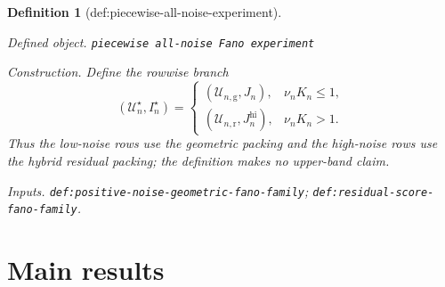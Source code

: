 \documentclass{article}
\newtheorem{definition}{Definition}
\begin{document}
\begin{definition}[def:piecewise-all-noise-experiment]\label{def:piecewise-all-noise-experiment}
\par\smallskip\noindent\emph{Defined object.} \texttt{piecewise all-\allowbreak{}noise Fano experiment}
\par\smallskip\noindent\emph{Construction.} Define the rowwise branch
\[
 (\mathcal U_n^\star,I_n^\star)=
 \begin{cases}
 (\mathcal U_{n,\mathrm g},J_n),&\nu_nK_n\leq1,\\
 (\mathcal U_{n,\mathrm r},J_n^{\mathrm{hi}}),&\nu_nK_n>1.
 \end{cases}
\]
Thus the low-noise rows use the geometric packing and the high-noise rows use the hybrid residual packing; the definition makes no upper-band claim.
\par\smallskip\noindent\emph{Inputs.} \texttt{def:\allowbreak{}positive-\allowbreak{}noise-\allowbreak{}geometric-\allowbreak{}fano-\allowbreak{}family}; \texttt{def:\allowbreak{}residual-\allowbreak{}score-\allowbreak{}fano-\allowbreak{}family}.
\end{definition}

\section{Main results}
\end{document}
